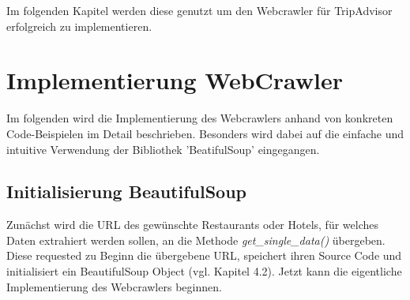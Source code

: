 \documentclass[a4paper,oneside,12pt]{report}
\begin{document}
			Im folgenden Kapitel werden diese genutzt um den Webcrawler für TripAdvisor erfolgreich zu implementieren.
	
	
		\section{Implementierung WebCrawler}
			
			Im folgenden wird die Implementierung des Webcrawlers anhand von konkreten Code-Beispielen im Detail beschrieben. Besonders wird dabei auf die einfache und intuitive Verwendung der Bibliothek 'BeatifulSoup' eingegangen.
	
	
			\subsection{Initialisierung BeautifulSoup}
			
				Zunächst wird die URL des gewünschte Restaurants oder Hotels, für welches Daten extrahiert werden sollen, an die Methode \textit{get\_single\_data()} übergeben. Diese requested zu Beginn die übergebene URL, speichert ihren Source Code und initialisiert ein BeautifulSoup Object (vgl. Kapitel 4.2). Jetzt kann die eigentliche Implementierung des Webcrawlers beginnen. 
	
\end{document}
